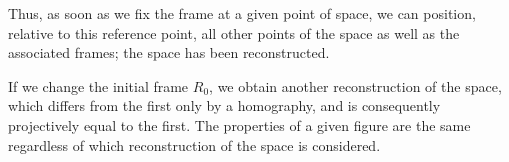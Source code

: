 Thus, as soon as we fix the frame at a given point of space, we can position, relative to this reference point, all other points of the space as well as the associated frames; the space has been reconstructed.

If we change the initial frame $R_0$, we obtain another reconstruction of the space, which differs from the first only by a homography, and is consequently projectively equal to the first. The properties of a given figure are the same regardless of which  reconstruction of the space is considered.














































































